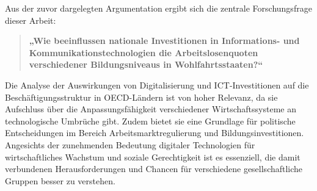 Aus der zuvor dargelegten Argumentation ergibt sich die zentrale Forschungsfrage 
dieser Arbeit:

\begin{quote} \textbf{„Wie beeinflussen nationale Investitionen in Informations- und 
    Kommunikationstechnologien die Arbeitslosenquoten verschiedener Bildungsniveaus 
    in Wohlfahrtsstaaten?“} \end{quote}

Die Analyse der Auswirkungen von Digitalisierung und \ac{ICT}-Investitionen auf die 
Beschäftigungsstruktur in \ac{OECD}-Ländern ist von hoher Relevanz, da sie Aufschluss 
über die Anpassungsfähigkeit verschiedener Wirtschaftssysteme an technologische 
Umbrüche gibt. Zudem bietet sie eine Grundlage für politische Entscheidungen im 
Bereich Arbeitsmarktregulierung und Bildungsinvestitionen. Angesichts der zunehmenden 
Bedeutung digitaler Technologien für wirtschaftliches Wachstum und soziale 
Gerechtigkeit ist es essenziell, die damit verbundenen Herausforderungen und Chancen 
für verschiedene gesellschaftliche Gruppen besser zu verstehen.
